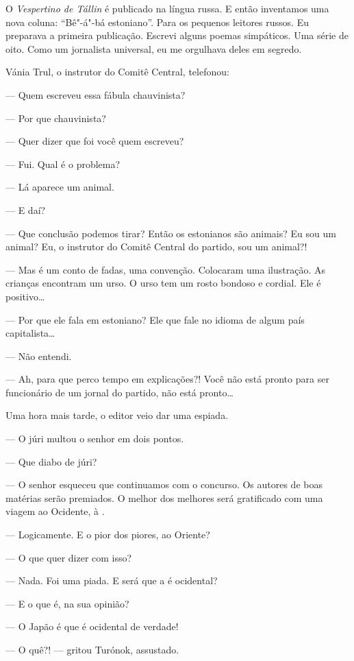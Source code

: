 O \emph{Vespertino de Tállin} é publicado na língua russa. E então
inventamos uma nova coluna: ``Bê"-á"-bá estoniano''. Para os pequenos
leitores russos. Eu preparava a primeira publicação. Escrevi alguns
poemas simpáticos. Uma série de oito. Como um jornalista universal, eu
me orgulhava deles em segredo.

Vánia Trul, o instrutor do Comitê Central, telefonou:

--- Quem escreveu essa fábula chauvinista?

--- Por que chauvinista?

--- Quer dizer que foi você quem escreveu?

--- Fui. Qual é o problema?

--- Lá aparece um animal.

--- E daí?

--- Que conclusão podemos tirar? Então os estonianos são animais? Eu sou
um animal? Eu, o instrutor do Comitê Central do partido, sou um animal?!

--- Mas é um conto de fadas, uma convenção. Colocaram uma ilustração. As
crianças encontram um urso. O urso tem um rosto bondoso e cordial. Ele é
positivo\ldots{}

--- Por que ele fala em estoniano? Ele que fale no idioma de algum país
capitalista\ldots{}

--- Não entendi.

--- Ah, para que perco tempo em explicações?! Você não está pronto para
ser funcionário de um jornal do partido, não está pronto\ldots{}

Uma hora mais tarde, o editor veio dar uma espiada.

--- O júri multou o senhor em dois pontos.

--- Que diabo de júri?

--- O senhor esqueceu que continuamos com o concurso. Os autores de boas
matérias serão premiados. O melhor dos melhores será gratificado com uma
viagem ao Ocidente, à .

--- Logicamente. E o pior dos piores, ao Oriente?

--- O que quer dizer com isso?

--- Nada. Foi uma piada. E será que a  é ocidental?

--- E o que é, na sua opinião?

--- O Japão é que é ocidental de verdade!

--- O quê?! --- gritou Turónok, assustado.

